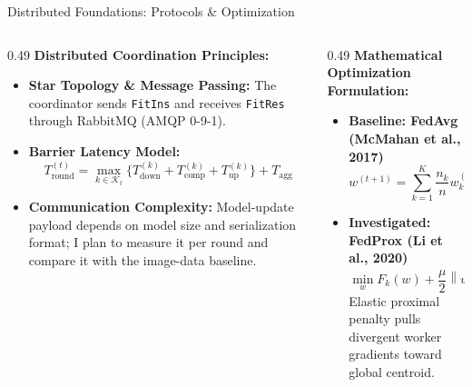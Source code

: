 \documentclass[aspectratio=169]{beamer}
\begin{document}
\begin{frame}{Distributed Foundations: Protocols \& Optimization}
    \begin{columns}[T]
        \begin{column}{0.49\textwidth}
            \textbf{Distributed Coordination Principles:}
            \begin{itemize}\footnotesize
                \item \textbf{Star Topology \& Message Passing:} The coordinator sends \texttt{FitIns} and receives \texttt{FitRes} through RabbitMQ (AMQP 0-9-1).
                \item \textbf{Barrier Latency Model:}
                {\scriptsize
                \[
                T_{\text{round}}^{(t)} = \max_{k \in \mathcal{K}_t} \{T_{\text{down}}^{(k)} + T_{\text{comp}}^{(k)} + T_{\text{up}}^{(k)}\} + T_{\text{agg}}
                \]}
                \item \textbf{Communication Complexity:} Model-update payload depends on model size and serialization format; I plan to measure it per round and compare it with the image-data baseline.
            \end{itemize}
        \end{column}
        \begin{column}{0.49\textwidth}
            \textbf{Mathematical Optimization Formulation:}
            \begin{itemize}\footnotesize
                \item \textbf{Baseline: FedAvg (McMahan et al., 2017)}
                {\scriptsize
                \[
                w^{(t+1)} = \sum_{k=1}^K \frac{n_k}{n} w_k^{(t+1)}
                \]}
                \item \textbf{Investigated: FedProx (Li et al., 2020)}
                {\scriptsize
                \[
                \min_{w} F_k(w) + \frac{\mu}{2}\left\| w - w^{(t)} \right\|_2^2
                \]}
                Elastic proximal penalty pulls divergent worker gradients toward global centroid.
            \end{itemize}
        \end{column}
    \end{columns}
\end{frame}
\end{document}
